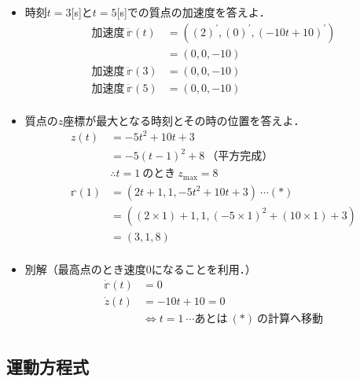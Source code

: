 \documentclass[a4paper,11pt]{ltjsarticle}
\begin{document}
\begin{enumerate}
\begin{itemize}
      \item 時刻$t=3$[s]と$t=5$[s]での質点の加速度を答えよ．
      \begin{equation*}
        \begin{aligned}
          加速度\ \ddot{\mathbb{r}}(t) &= ((2)^{\prime},(0)^{\prime},(-10t+10)^{\prime}) \\
                            &= (0,0,-10) \\
          加速度\ \ddot{\mathbb{r}}(3) &= (0,0,-10) \\
          加速度\ \ddot{\mathbb{r}}(5) &= (0,0,-10) \\
        \end{aligned}
      \end{equation*}
      \item 質点の$z$座標が最大となる時刻とその時の位置を答えよ．
      \begin{equation*}
        \begin{aligned}
          z(t)  &= -5t^{2}+10t+3 \\
                &= -5(t-1)^{2}+8\ \text{（平方完成）} \\
                &\therefore t=1\ のとき\ z_{\mathrm{max}}=8 \\
          \mathbb{r}(1) &=(2t+1,1,-5t^{2}+10t+3) \ \cdots (\ast) \\
                        &=((2 \times 1)+1,1,(-5 \times 1)^{2}+(10 \times 1)+3) \\
                        &=(3,1,8) \\
        \end{aligned}
      \end{equation*}
      \item 別解（最高点のとき速度$0$になることを利用．）
      \begin{equation*}
        \begin{aligned}
          \dot{\mathbb{r}}(t)  &= 0\\
                    \dot{z}(t) &= -10t+10 =0 \\
                               &\Leftrightarrow t=1\ \cdots あとは\ (\ast)\ の計算へ移動  \\
        \end{aligned}
      \end{equation*}
    \end{itemize}
  \end{enumerate}

\subsection{運動方程式}
\end{document}

